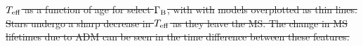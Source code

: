 \documentclass[useAMS,usenatbib]{mnras}
\providecommand{\DIFdel}[1]{{\protect\color{red}\sout{#1}}}                      %
\providecommand{\DIFdelend}{} %
\providecommand{\DIFdelFL}[1]{\DIFdel{#1}} %
\DeclareRobustCommand{\DIFdelend}{\DIFOaddend \let\includegraphics\DIFOincludegraphics} %
\begin{document}
{%
\DIFdelFL{$T_{\mathrm{eff}}$ as a function of age for select $\Gamma_\mathrm{B}$, with with }%
\DIFdelFL{models overplotted as thin lines. Stars undergo a sharp decrease in $T_{\mathrm{eff}}$ as they leave the MS. The change in MS lifetimes due to ADM can be seen in the time difference between these features.
  }}

\DIFdelend 







\bsp	%

\label{lastpage}
\end{document}
